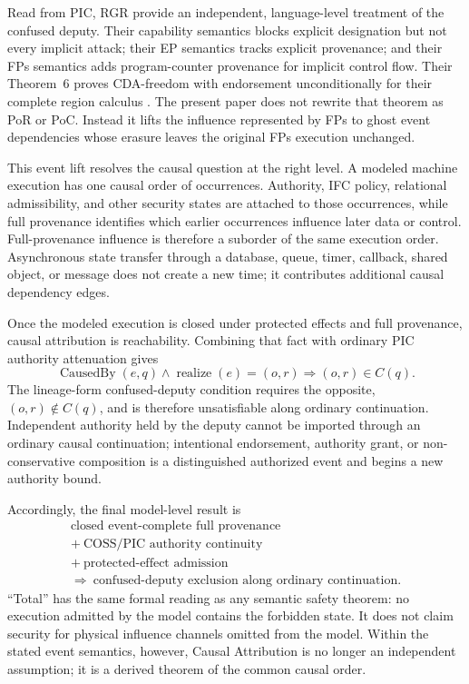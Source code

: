 \documentclass[10pt,twocolumn]{article}
\newcommand{\CausedBy}{\operatorname{CausedBy}}
\newcommand{\Realize}{\operatorname{realize}}
\begin{document}
Read from PIC, RGR provide an independent, language-level treatment of the
confused deputy. Their
capability semantics blocks explicit designation but not every implicit attack;
their EP semantics tracks explicit provenance; and their FPs semantics adds
program-counter provenance for implicit control flow. Their Theorem~6 proves
CDA-freedom with endorsement unconditionally for their complete region calculus
\cite{rajani_garg_rezk2016}. The present paper does not rewrite that theorem as
PoR or PoC. Instead it lifts the influence represented by FPs to ghost event
dependencies whose erasure leaves the original FPs execution unchanged.

This event lift resolves the causal question at the right level. A modeled
machine execution has one causal order of occurrences. Authority, IFC policy,
relational admissibility, and other security states are attached to those
occurrences, while full provenance identifies which earlier occurrences
influence later data or control. Full-provenance influence is therefore a
suborder of the same execution order. Asynchronous state transfer through a
database, queue, timer, callback, shared object, or message does not create a
new time; it contributes additional causal dependency edges.

Once the modeled execution is closed under protected effects and full
provenance, causal attribution is reachability. Combining that fact with
ordinary PIC authority attenuation gives
\begin{equation}
  \CausedBy(e,q)\land\Realize(e)=(o,r)
  \Longrightarrow (o,r)\in C(q).
\end{equation}
The lineage-form confused-deputy condition requires the opposite,
$(o,r)\notin C(q)$, and is therefore unsatisfiable along ordinary
continuation. Independent authority held
by the deputy cannot be imported through an ordinary causal continuation;
intentional endorsement, authority grant, or non-conservative composition is a
distinguished authorized event and begins a new authority bound.

Accordingly, the final model-level result is
\begin{equation}
\boxed{
\begin{gathered}
\text{closed event-complete full provenance}\\
{}+\ \text{COSS/PIC authority continuity}\\
{}+\ \text{protected-effect admission}\\
\Longrightarrow\ \text{confused-deputy exclusion along ordinary continuation}.
\end{gathered}}
\end{equation}
``Total'' has the same formal reading as any semantic safety theorem: no
execution admitted by the model contains the forbidden state. It does not
claim security for physical influence channels omitted from the model. Within
the stated event semantics, however, Causal Attribution is no longer an
independent assumption; it is a derived theorem of the common causal order.
\end{document}
